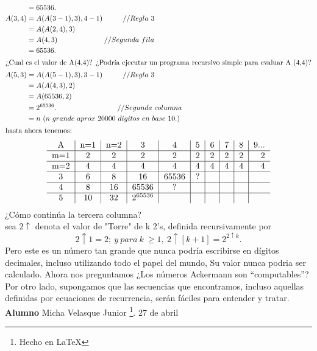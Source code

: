 \documentclass[11pt,a4paper]{article}
\begin{document}
\begin{align*}
				   &=65536.\\
 A(3,4) &= A(A(3-1),3),4-1) \hspace*{1cm} // Regla~3\\
                   &= A(A(2,4), 3) \hspace*{2cm} \\
				   &=A(4,3)	\hspace*{2,3cm} // Segunda~fila\\
				   &=65536.\\				   			   
\intertext{¿Cual es el valor de A(4,4)?  
¿Podría ejecutar un programa recursivo simple para evaluar A (4,4)?}
 A(5,3) &= A(A(5-1),3),3-1) \hspace*{1cm} // Regla~3\\
                   &= A(A(4,3), 2) \hspace*{2cm} \\
				   &=A(65536,2)	\hspace*{2,3cm}\\
				   &=2^{65536}.\hspace*{3cm}// Segunda~columna\\
				   &=n~(n~ grande~aprox~20000~digitos~en~base~10.)\\
\intertext{hasta ahora tenemos:}
\end{align*}
\begin{equation*}
\begin{tabular}{ c| c| c| c| c| c| c| c| c| r }
     A & n=1 & n=2 & 3 & 4 & 5 & 6 & 7 & 8 & 9... \\
   \hline
   m=1 & 2 & 2 & 2 & 2 & 2 & 2 & 2 & 2 & 2 \\
   \hline
   m=2 & 4 & 4 & 4 & 4 & 4 & 4 & 4 & 4 & 4 \\
   \hline
   3   & 6 & 8 & 16 & 65536 & ? &  &  &  &  \\
   \hline
   4   & 8 & 16 & 65536 & ? &  &  &  &  &  \\
   \hline
   5  & 10 & 32 & $2^{65536}$ &  &  &  &  &  &  \\
\end{tabular}
\end{equation*}
¿Cómo continúa la tercera columna?\\
sea $2\uparrow$ denota el valor de "Torre" de k 2's, definida recursivamente por 
$$2\uparrow 1= 2;~ y~ para~ k ~\geq 1,~ 2\uparrow [k+1]= 2^{2\uparrow k}.$$
Pero este es un número tan grande que nunca podría escribirse en dígitos decimales, incluso utilizando todo el papel del mundo, Su valor nunca podria ser calculado. Ahora nos preguntamos ¿Los números Ackermann son “computables”? Por otro lado, supongamos que las secuencias que encontramos, incluso aquellas definidas por ecuaciones de recurrencia, serán fáciles para entender y tratar.
\vfill \textbf{Alumno} Micha Velasque Junior \footnote{Hecho en \LaTeX}.
\hfill 27 de abril
\end{document}
